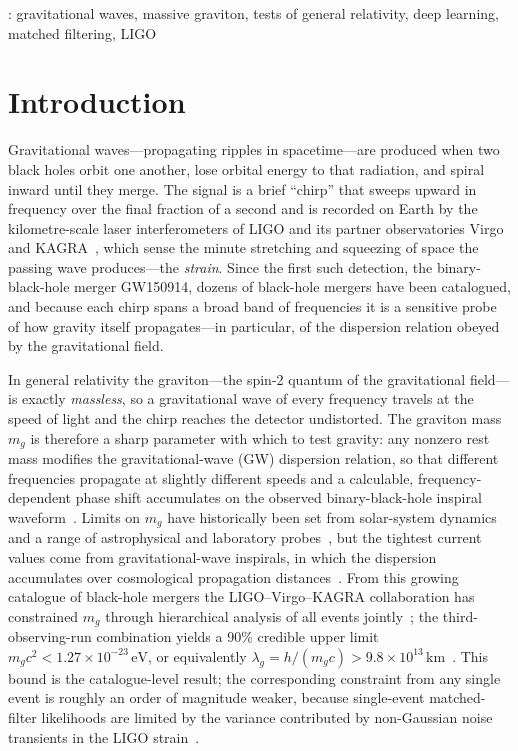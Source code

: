 \documentclass[11pt,a4paper]{article}
\newcommand{\km}{\text{km}}
\newcommand{\mg}{m_{g}}
\newcommand{\lamg}{\lambda_{g}}
\begin{document}
: gravitational waves, massive graviton, tests of
general relativity, deep learning, matched filtering, LIGO

\section{Introduction}\label{sec:intro}

Gravitational waves---propagating ripples in spacetime---are produced
when two black holes orbit one another, lose orbital energy to that
radiation, and spiral inward until they merge. The signal is a brief
``chirp'' that sweeps upward in frequency over the final fraction of a
second and is recorded on Earth by the kilometre-scale laser
interferometers of LIGO and its partner observatories Virgo and
KAGRA~\cite{Aasi2015_aLIGO,Abbott2016_GW150914}, which sense the minute
stretching and squeezing of space the passing wave produces---the
\emph{strain}. Since the first such detection, the binary-black-hole
merger GW150914, dozens of black-hole mergers have been catalogued,
and because each chirp spans a broad band of frequencies it is a
sensitive probe of how gravity itself propagates---in particular, of the
dispersion relation obeyed by the gravitational field.

In general relativity the graviton---the spin-2 quantum of the
gravitational field---is exactly \emph{massless}, so a gravitational wave
of every frequency travels at the speed of light and the chirp reaches
the detector undistorted. The graviton mass $\mg$ is therefore a sharp
parameter with which to test gravity: any nonzero rest mass modifies the
gravitational-wave (GW) dispersion relation, so that different
frequencies propagate at slightly different speeds and a calculable,
frequency-dependent phase shift accumulates on the observed
binary-black-hole inspiral
waveform~\cite{Will1998,MirshekariYunesWill2012}. Limits on
$\mg$ have historically been set from solar-system dynamics and a range
of astrophysical and laboratory probes~\cite{Goldhaber2010,deRham2017,Will2014},
but the tightest current values come from gravitational-wave inspirals,
in which the dispersion accumulates over cosmological propagation
distances~\cite{Abbott2016_TGR}. From this growing catalogue of
black-hole mergers the LIGO--Virgo--KAGRA collaboration has constrained
$\mg$ through hierarchical analysis of all events
jointly~\cite{TestGR_arXiv2112};
the third-observing-run combination yields a 90\% credible upper
limit $\mg c^{2}<1.27\times 10^{-23}\,\mathrm{eV}$, or equivalently
$\lamg=h/(\mg c)>9.8\times 10^{13}\,\km$~\cite{TestGR_arXiv2112}. This
bound is the catalogue-level result; the corresponding constraint from
any single event is roughly an order of magnitude weaker, because
single-event matched-filter likelihoods are limited by the variance
contributed by non-Gaussian noise transients in the LIGO
strain~\cite{Cabero2020,Nitz2018}.
\end{document}
